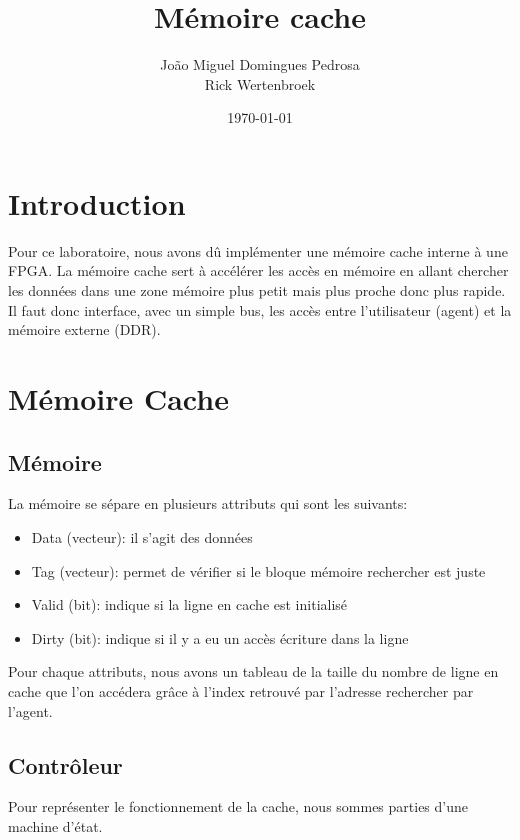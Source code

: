 \documentclass[10pt,a4paper]{article}
\author{João Miguel Domingues Pedrosa\\Rick Wertenbroek}
\title{Mémoire cache}
\date{\today}
\begin{document}
\maketitle
\newpage
\tableofcontents
\newpage

\section{Introduction}
Pour ce laboratoire, nous avons dû implémenter une mémoire cache interne à une FPGA. La mémoire cache sert à accélérer les accès en mémoire en allant chercher les données dans une zone mémoire plus petit mais plus proche donc plus rapide. Il faut donc interface, avec un simple bus, les accès entre l'utilisateur (agent) et la mémoire externe (DDR).

\section{Mémoire Cache}
\subsection{Mémoire}
La mémoire se sépare en plusieurs attributs qui sont les suivants:\\

\begin{itemize}
	\item Data (vecteur): il s'agit des données
	\item Tag  (vecteur): permet de vérifier si le bloque mémoire rechercher est juste
	\item Valid (bit): indique si la ligne en cache est initialisé
	\item Dirty (bit): indique si il y a eu un accès écriture dans la ligne\\
\end{itemize}

Pour chaque attributs, nous avons un tableau de la taille du nombre de ligne en cache que l'on accédera grâce à l'index retrouvé par l'adresse rechercher par l'agent.

\newpage

\subsection{Contrôleur}
Pour représenter le fonctionnement de la cache, nous sommes parties d'une machine d'état.
\end{document}
